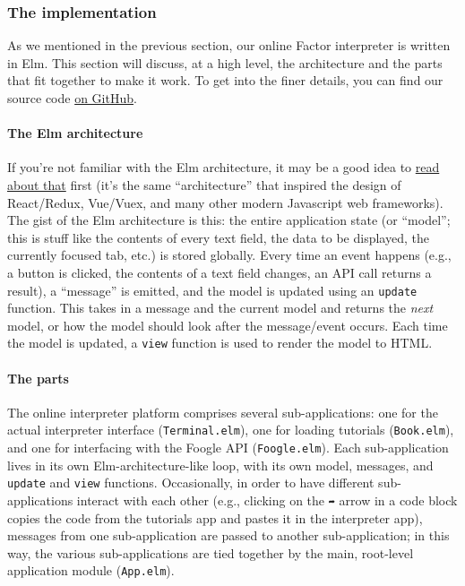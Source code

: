 \documentclass[
]{article}
\begin{document}
\hypertarget{the-implementation}{%
\subsubsection{The implementation}\label{the-implementation}}

As we mentioned in the previous section, our online Factor interpreter
is written in Elm. This section will discuss, at a high level, the
architecture and the parts that fit together to make it work. To get
into the finer details, you can find our source code
\href{https://github.com/factor-hmc/simple-interpreter}{on GitHub}.

\hypertarget{the-elm-architecture}{%
\paragraph{The Elm architecture}\label{the-elm-architecture}}

If you're not familiar with the Elm architecture, it may be a good idea
to \href{https://guide.elm-lang.org/architecture/}{read about that}
first (it's the same ``architecture'' that inspired the design of
React/Redux, Vue/Vuex, and many other modern Javascript web frameworks).
The gist of the Elm architecture is this: the entire application state
(or ``model''; this is stuff like the contents of every text field, the
data to be displayed, the currently focused tab, etc.) is stored
globally. Every time an event happens (e.g., a button is clicked, the
contents of a text field changes, an API call returns a result), a
``message'' is emitted, and the model is updated using an
\texttt{update} function. This takes in a message and the current model
and returns the \emph{next} model, or how the model should look after
the message/event occurs. Each time the model is updated, a
\texttt{view} function is used to render the model to HTML.

\hypertarget{the-parts}{%
\paragraph{The parts}\label{the-parts}}

The online interpreter platform comprises several sub-applications: one
for the actual interpreter interface (\texttt{Terminal.elm}), one for
loading tutorials (\texttt{Book.elm}), and one for interfacing with the
Foogle API (\texttt{Foogle.elm}). Each sub-application lives in its own
Elm-architecture-like loop, with its own model, messages, and
\texttt{update} and \texttt{view} functions. Occasionally, in order to
have different sub-applications interact with each other (e.g., clicking
on the \texttt{➦} arrow in a code block copies the code from the
tutorials app and pastes it in the interpreter app), messages from one
sub-application are passed to another sub-application; in this way, the
various sub-applications are tied together by the main, root-level
application module (\texttt{App.elm}).
\end{document}
